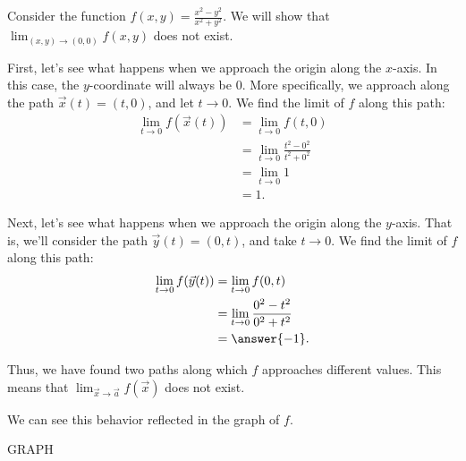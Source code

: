 \documentclass{ximera}
\begin{document}
\begin{example}
Consider the function $f(x,y) = \frac{x^2-y^2}{x^2+y^2}$. We will show that $\lim_{(x,y)\rightarrow(0,0)} f(x,y)$ does not exist.

First, let's see what happens when we approach the origin along the $x$-axis. In this case, the $y$-coordinate will always be $0$. More specifically, we approach along the path $\vec{x}(t) = (t,0)$, and let $t\rightarrow 0$. We find the limit of $f$ along this path:
\begin{align*}
\lim_{t\rightarrow 0}f(\vec{x}(t)) &= \lim_{t\rightarrow 0}f(t,0)\\
&= \lim_{t\rightarrow 0}\frac{t^2-0^2}{t^2+0^2}\\
&= \lim_{t\rightarrow 0}1\\
&= 1.
\end{align*}

Next, let's see what happens when we approach the origin along the $y$-axis. That is, we'll consider the path $\vec{y}(t) = (0,t)$, and take $t\rightarrow 0$. We find the limit of $f$ along this path:
\begin{align*}
\lim_{t\rightarrow 0}f(\vec{y}(t)) &= \lim_{t\rightarrow 0}f(0,t)\\
&= \lim_{t\rightarrow 0}\frac{0^2-t^2}{0^2+t^2}\\
&= \answer{-1}.
\end{align*}

Thus, we have found two paths along which $f$ approaches different values. This means that $\lim_{\vec{x}\rightarrow\vec{a}}f(\vec{x})$ does not exist.

We can see this behavior reflected in the graph of $f$.

GRAPH
\end{example}
\end{document}
